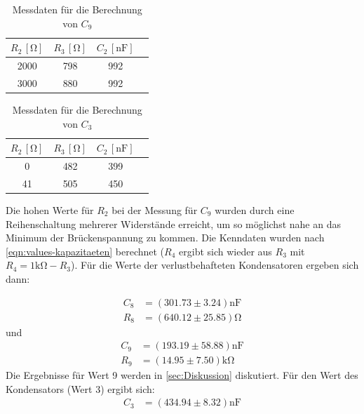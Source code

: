 \begin{table}
  \centering
  \caption{Messdaten für die Berechnung von $C_9$}
  \label{tab:C9}
  \begin{tabular}{c c c c}
  \toprule
  $R_2 \, [\si{\ohm}]$ &$R_3 \, [\si{\ohm}]$ &$C_2 \, [\si{\nano} \si{\farad}]$\\
  \midrule
  2000 & 798 & 992 \\
  3000  & 880 & 992 \\ 
  \bottomrule
\end{tabular}
\end{table}

\begin{table}
  \centering
  \caption{Messdaten für die Berechnung von $C_3$}
  \label{tab:C3}
  \begin{tabular}{c c c c}
  \toprule
  $R_2 \, [\si{\ohm}]$ &$R_3 \, [\si{\ohm}]$ &$C_2 \, [\si{\nano} \si{\farad}]$\\
  \midrule
  0 & 482 & 399 \\
  41  & 505 & 450 \\ 
  \bottomrule
\end{tabular}
\end{table}

Die hohen Werte für $R_2$ bei der Messung für $C_9$ wurden durch eine Reihenschaltung mehrerer Widerstände erreicht, um so möglichst nahe an das Minimum der Brückenspannung zu kommen. Die Kenndaten wurden nach \autoref{eqn:values-kapazitaeten} berechnet ($R_4$ ergibt sich wieder aus $R_3$ mit $R_4=1\si{\kilo}\si{\ohm}-R_3$).
Für die Werte der verlustbehafteten Kondensatoren ergeben sich dann:

\begin{align}
  C_8&=(301.73 \pm 3.24)\si{\nano} \si{\farad}\\
  R_8&=(640.12 \pm 25.85) \si{\ohm}
\end{align}
und
\begin{align}
  C_9&=(193.19 \pm 58.88)\si{\nano} \si{\farad}\\
  R_9&=(14.95 \pm 7.50)\si{\kilo} \si{\ohm}
\end{align}
Die Ergebnisse für Wert 9 werden in \autoref{sec:Diskussion} diskutiert. 
Für den Wert des Kondensators (Wert 3) ergibt sich:
\begin{align}
  C_3&=(434.94 \pm 8.32)\si{\nano} \si{\farad}
\end{align}

